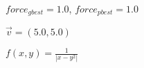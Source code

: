 \documentclass[10pt,a4paper]{article}
\begin{document}
$force_{gbest} = 1.0$, $force_{pbest} = 1.0$

$\vec{v} = (5.0, 5.0)$

$f(x, y) = \frac{1}{|x - y^2|}$
\end{document}
